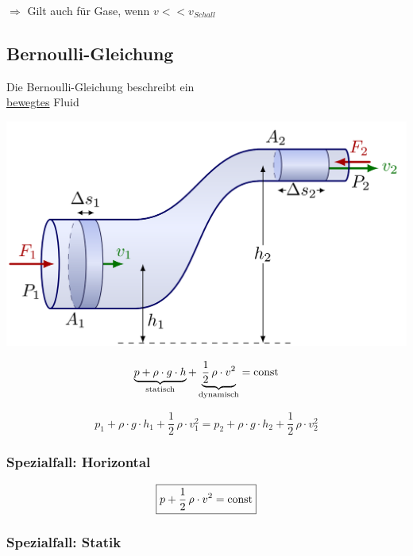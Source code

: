 $\Rightarrow$ Gilt auch für Gase, wenn $v << v_{Schall}$

\vfill\null
\columnbreak


\subsection{Bernoulli-Gleichung}

\begin{minipage}{0.38\linewidth}
Die Bernoulli-Gleichung beschreibt ein \\
\underline{bewegtes} Fluid \\
\end{minipage}
\hfill
\begin{minipage}{0.6\linewidth}
\includegraphics[width=0.99\linewidth]{Bilder/Bernoulli} \\
\end{minipage}








$$ \underbrace{ p + \rho \cdot g \cdot h }_{\substack{\mathrm{statisch}}} + \underbrace{ \frac{1}{2} \, \rho \cdot v^2 }_{\substack{\mathrm{dynamisch}}} = \mathrm{const} $$
	
	$$ \boxed{ p_1 +  \rho \cdot g \cdot h_1 + \frac{1}{2} \, \rho \cdot v_1^2 = p_2 +  \rho \cdot g \cdot h_2 + \frac{1}{2} \, \rho \cdot v_2^2 } $$


\subsubsection{Spezialfall: Horizontal}

$$ \boxed{ p + \frac{1}{2} \, \rho \cdot v^2 = \mathrm{const} } $$


\subsubsection{Spezialfall: Statik}

